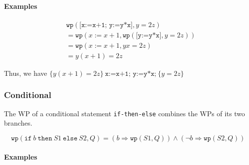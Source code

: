 \documentclass[oneside,11pt,dvipsnames]{book}
\renewcommand{\implies}{\Rightarrow}
\newcommand{\code}[1]{\texttt{#1}}
\begin{document}
%
\paragraph{Examples}

\begin{equation*}
\begin{split}
    &\code{wp}(\code{[x:=x+1; y:=y*x]}, y=2z) \\
    &= \code{wp}  (x:=x+1, \code{wp}(\code{[y:=y*x]}, y=2z))\\
    &= \code{wp}(x:=x+1, yx=2z)\\
    &= y(x+1)=2z
\end{split}
\end{equation*}


Thus, we have $\{y(x+1)=2z\} ~ \code{x:=x+1; y:=y*x;} ~ \{y=2z\}$

\subsubsection{Conditional}\label{conditional}

The WP of a conditional statement \code{if-then-else} combines the WPs of its two branches.

\begin{equation}\label{eq:wp-conditional}
\code{wp}(\code{if}~b~\code{then}~S1~\code{else}~S2, Q)  =  (b \implies \code{wp}(S1,Q))  \land  (\neg b \implies \code{wp}(S2, Q))
\end{equation}

\paragraph{Examples}
\end{document}
